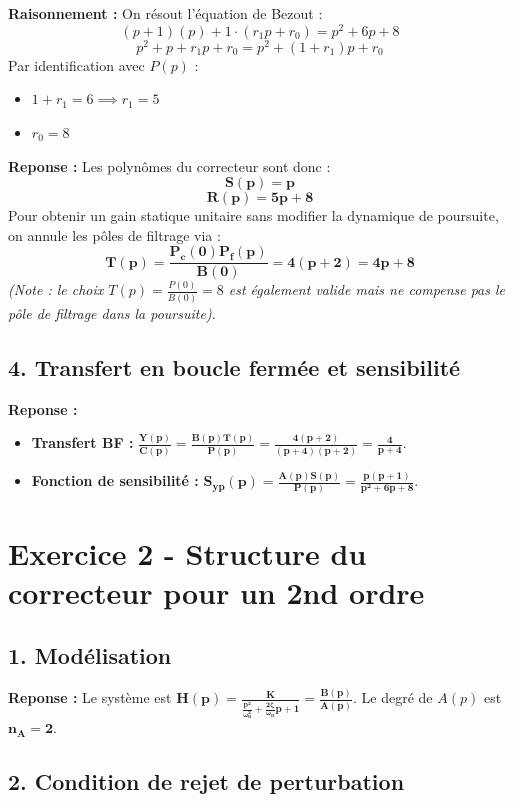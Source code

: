 \documentclass[11pt,a4paper]{article}
\begin{document}
\textbf{Raisonnement :} On résout l'équation de Bezout :
$$ (p+1)(p) + 1 \cdot (r_1 p + r_0) = p^2 + 6p + 8 $$
$$ p^2 + p + r_1 p + r_0 = p^2 + (1+r_1)p + r_0 $$
Par identification avec $P(p)$ :
\begin{itemize}
    \item $1+r_1 = 6 \implies r_1 = 5$
    \item $r_0 = 8$
\end{itemize}

\textbf{Reponse :} Les polynômes du correcteur sont donc :
$$ 
\mathbf{S(p) = p} 
$$
$$ 
\mathbf{R(p) = 5p + 8} 
$$
Pour obtenir un gain statique unitaire sans modifier la dynamique de poursuite, on annule les pôles de filtrage via :
$$ 
\mathbf{T(p) = \frac{P_c(0)P_f(p)}{B(0)} = 4(p+2) = 4p+8} 
$$
\textit{(Note : le choix $T(p) = \frac{P(0)}{B(0)} = 8$ est également valide mais ne compense pas le pôle de filtrage dans la poursuite).}

\subsection*{4. Transfert en boucle fermée et sensibilité}

\textbf{Reponse :} 
\begin{itemize}
    \item \textbf{Transfert BF :} $\mathbf{\frac{Y(p)}{C(p)} = \frac{B(p)T(p)}{P(p)} = \frac{4(p+2)}{(p+4)(p+2)} = \frac{4}{p+4}}$.
    \item \textbf{Fonction de sensibilité :} $\mathbf{S_{yp}(p) = \frac{A(p)S(p)}{P(p)} = \frac{p(p+1)}{p^2+6p+8}}$.
\end{itemize}

\hrulefill

\section*{Exercice 2 - Structure du correcteur pour un 2nd ordre}

\subsection*{1. Modélisation}

\textbf{Reponse :} Le système est $\mathbf{H(p) = \frac{K}{\frac{p^2}{\omega_n^2} + \frac{2\zeta}{\omega_n}p + 1} = \frac{B(p)}{A(p)}}$.
Le degré de $A(p)$ est $\mathbf{n_A = 2}$.

\subsection*{2. Condition de rejet de perturbation}
\end{document}
